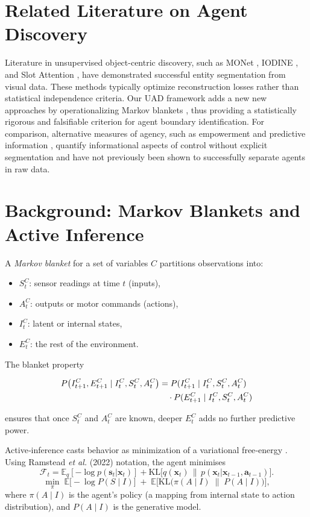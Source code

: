 \documentclass[10pt,conference]{IEEEtran}
\newcommand{\hstate}{\mathbf x}        %
\newcommand{\obs}{\mathbf s}           %
\newcommand{\act}{\mathbf a}           %
\newcommand{\FreeE}{\mathcal F}        %
\begin{document}
\section{Related Literature on Agent Discovery}
Literature in unsupervised object-centric discovery, such as MONet \cite{burgess2019monet}, IODINE \cite{greff2019iodine}, and Slot Attention \cite{locatello2020slot}, have demonstrated successful entity segmentation from visual data. 
These methods typically optimize reconstruction losses rather than statistical independence criteria. 
Our UAD framework adds a new new approaches by operationalizing Markov blankets \cite{kirchhoff2018markov,ramstead2022bayesian}, 
thus providing a statistically rigorous and falsifiable criterion for agent boundary identification. 
For comparison, alternative measures of agency, such as empowerment \cite{salge2014empowerment} and predictive information \cite{bialek2001predictability}, 
quantify informational aspects of control without explicit segmentation and have not previously been shown to successfully separate agents in raw data.


\section{Background: Markov Blankets and Active Inference}
A \emph{Markov blanket} for a set of variables $C$ partitions observations into:
\begin{itemize}
  \item $S^C_t$: sensor readings at time $t$ (inputs),
  \item $A^C_t$: outputs or motor commands (actions),
  \item $I^C_t$: latent or internal states,
  \item $E^C_t$: the rest of the environment.
\end{itemize}
The blanket property

\begin{align}
P\bigl(I^C_{t+1},E^C_{t+1} \mid I^C_t, S^C_t, A^C_t\bigr)
&= P(I^C_{t+1} \mid I^C_t, S^C_t, A^C_t) \notag \\
&\quad \cdot P(E^C_{t+1} \mid I^C_t, S^C_t, A^C_t)
\end{align}

ensures that once $S^C_t$ and $A^C_t$ are known, deeper $E^C_t$ adds no further predictive power.  

Active‐inference casts behavior as minimization of a variational free‐energy \cite{Friston2010}. Using Ramstead \textit{et al.}
(2022) notation, the agent minimises $$\FreeE_t=\mathbb E_q[-\log p(\obs_t|\hstate_t)]+\mathrm{KL}\bigl[q(\hstate_t)\,\|\,p(\hstate_t|\hstate_{t-1},\act_{t-1})\bigr].$$
\[
\min_{\pi}\;\mathbb{E}\bigl[-\log P(S\mid I)\bigr]
\;+\;\mathbb{E}\bigl[\mathrm{KL}\bigl(\pi(A\mid I)\;\|\;P(A\mid I)\bigr)\bigr],
\]
where $\pi(A\mid I)$ is the agent's policy (a mapping from internal state to action distribution), and $P(A\mid I)$ is the generative model.
\end{document}
